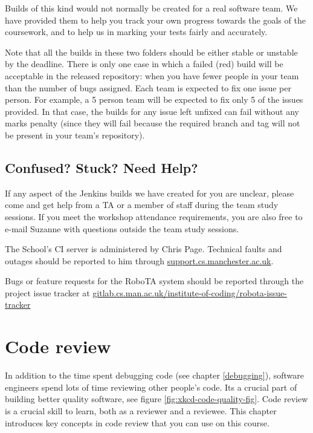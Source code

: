 \documentclass[
]{book}
\begin{document}
Builds of this kind would not normally be created for a real software team. We have provided them to help you track your own progress towards the goals of the coursework, and to help us in marking your tests fairly and accurately.

Note that all the builds in these two folders should be either stable or unstable by the deadline. There is only one case in which a failed (red) build will be acceptable in the released repository: when you have fewer people in your team than the number of bugs assigned. Each team is expected to fix one issue per person. For example, a 5 person team will be expected to fix only 5 of the issues provided. In that case, the builds for any issue left unfixed can fail without any marks penalty (since they will fail because the required branch and tag will not be present in your team's repository).

\hypertarget{confused}{%
\section{Confused? Stuck? Need Help?}\label{confused}}

If any aspect of the Jenkins builds we have created for you are unclear, please come and get help from a TA or a member of staff during the team study sessions. If you meet the workshop attendance requirements, you are also free to e-mail Suzanne with questions outside the team study sessions.

The School's CI server is administered by Chris Page. Technical faults and outages should be reported to him through \href{https://support.cs.manchester.ac.uk}{support.cs.manchester.ac.uk}.

Bugs or feature requests for the RoboTA system should be reported through the project issue tracker at \href{https://gitlab.cs.man.ac.uk/institute-of-coding/robota-issue-tracker}{gitlab.cs.man.ac.uk/institute-of-coding/robota-issue-tracker}

\hypertarget{reviewing}{%
\chapter{Code review}\label{reviewing}}

In addition to the time spent debugging code (see chapter \ref{debugging}), software engineers spend lots of time reviewing other people's code. Its a crucial part of building better quality software, see figure \ref{fig:xkcd-code-quality-fig}. Code review is a crucial skill to learn, both as a reviewer and a reviewee. This chapter introduces key concepts in code review that you can use on this course.
\end{document}
